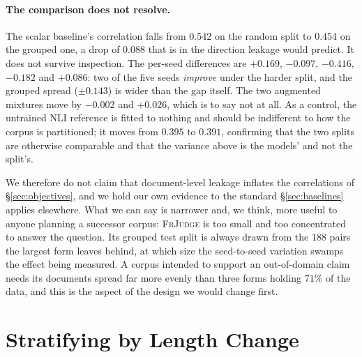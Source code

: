 \documentclass[11pt]{article}
\begin{document}
\begin{table}[t]\centering\small

\caption{Document-grouped split: no source form appears in both training and
test. Columns are as in Table~\ref{tab:models}, and the splits are size-matched
to it ($178/30/89$). The untrained NLI reference is recomputed on the grouped
splits rather than carried over, since a corpus-level correlation is not
comparable to a document-grouped one; the human ceiling is a property of the
annotations and does not depend on the split.}
\label{tab:models_grouped}
\end{table}

\paragraph{The comparison does not resolve.} The scalar baseline's correlation
falls from $0.542$ on the random split to $0.454$ on the grouped one, a drop of
$0.088$ that is in the direction leakage would predict. It does not survive
inspection. The per-seed differences are $+0.169$, $-0.097$, $-0.416$, $-0.182$
and $+0.086$: two of the five seeds \emph{improve} under the harder split, and
the grouped spread ($\pm0.143$) is wider than the gap itself. The two augmented
mixtures move by $-0.002$ and $+0.026$, which is to say not at all. As a
control, the untrained NLI reference is fitted to nothing and should be
indifferent to how the corpus is partitioned; it moves from $0.395$ to $0.391$,
confirming that the two splits are otherwise comparable and that the variance
above is the models' and not the split's.

We therefore do not claim that document-level leakage inflates the correlations
of \S\ref{sec:objectives}, and we hold our own evidence to the standard
\S\ref{sec:baselines} applies elsewhere. What we can say is narrower and, we
think, more useful to anyone planning a successor corpus: \textsc{FrJudge} is
too small and too concentrated to answer the question. Its grouped test split is
always drawn from the $188$ pairs the largest form leaves behind, at which size
the seed-to-seed variation swamps the effect being measured. A corpus intended
to support an out-of-domain claim needs its documents spread far more evenly
than three forms holding $71\%$ of the data, and this is the aspect of the
design we would change first.

\section{Stratifying by Length Change}
\label{app:buckets}
\end{document}
